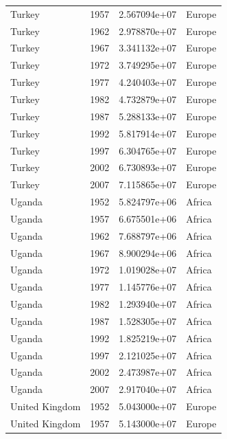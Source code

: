 \documentclass[
  letterpaper,
  DIV=11,
  numbers=noendperiod]{scrreprt}
\begin{document}
\begin{tcolorbox}
\begin{tabular}{lrrl}
Turkey                   &  1957 &  2.567094e+07 &    Europe \\
Turkey                   &  1962 &  2.978870e+07 &    Europe \\
Turkey                   &  1967 &  3.341132e+07 &    Europe \\
Turkey                   &  1972 &  3.749295e+07 &    Europe \\
Turkey                   &  1977 &  4.240403e+07 &    Europe \\
Turkey                   &  1982 &  4.732879e+07 &    Europe \\
Turkey                   &  1987 &  5.288133e+07 &    Europe \\
Turkey                   &  1992 &  5.817914e+07 &    Europe \\
Turkey                   &  1997 &  6.304765e+07 &    Europe \\
Turkey                   &  2002 &  6.730893e+07 &    Europe \\
Turkey                   &  2007 &  7.115865e+07 &    Europe \\
Uganda                   &  1952 &  5.824797e+06 &    Africa \\
Uganda                   &  1957 &  6.675501e+06 &    Africa \\
Uganda                   &  1962 &  7.688797e+06 &    Africa \\
Uganda                   &  1967 &  8.900294e+06 &    Africa \\
Uganda                   &  1972 &  1.019028e+07 &    Africa \\
Uganda                   &  1977 &  1.145776e+07 &    Africa \\
Uganda                   &  1982 &  1.293940e+07 &    Africa \\
Uganda                   &  1987 &  1.528305e+07 &    Africa \\
Uganda                   &  1992 &  1.825219e+07 &    Africa \\
Uganda                   &  1997 &  2.121025e+07 &    Africa \\
Uganda                   &  2002 &  2.473987e+07 &    Africa \\
Uganda                   &  2007 &  2.917040e+07 &    Africa \\
United Kingdom           &  1952 &  5.043000e+07 &    Europe \\
United Kingdom           &  1957 &  5.143000e+07 &    Europe \\

\end{tabular}
\end{tcolorbox}
\end{document}

